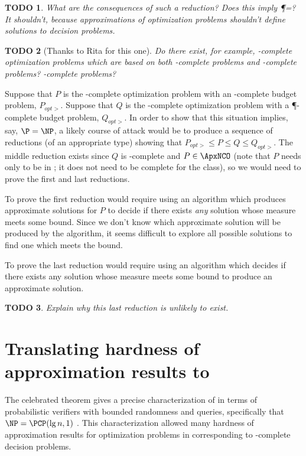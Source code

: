 \documentclass[]{article}
\theoremstyle{plain}
\newtheorem{todo}{TODO}
\theoremstyle{definition}
\begin{document}
\begin{todo}
  What are the consequences of such a reduction?
  Does this imply \P=\NP?
  It shouldn't, because approximations of optimization problems shouldn't define solutions to decision problems.
\end{todo}
\begin{todo}[Thanks to Rita for this one]
  Do there exist, for example, \ApxPO-complete optimization problems which are based on both \NP-complete problems and \PSPACE-complete problems?
  \STP-complete problems?
\end{todo}

Suppose that $P$ is the \ApxNCO-complete optimization problem with an \NP-complete budget problem, $P_{opt>}$.
Suppose that $Q$ is the \ApxNCO-complete optimization problem with a \P-complete budget problem, $Q_{opt>}$.
In order to show that this situation implies, say, $\P=\NP$, a likely course of attack would be to produce a sequence of reductions (of an appropriate type) showing that $P_{opt>} \leq P \leq Q \leq Q_{opt>}$.
The middle reduction exists since $Q$ is \ApxNCO-complete and $P\in\ApxNCO$ (note that $P$ needs only to be in \ApxNCO; it does not need to be complete for the class), so we would need to prove the first and last reductions.

To prove the first reduction would require using an algorithm which produces approximate solutions for $P$ to decide if there exists \emph{any} solution whose measure meets some bound.
Since we don't know which approximate solution will be produced by the algorithm, it seems difficult to explore all possible solutions to find one which meets the bound.

To prove the last reduction would require using an algorithm which decides if there exists any solution whose measure meets some bound to produce an approximate solution.

\begin{todo}
  Explain why this last reduction is unlikely to exist.
\end{todo}

\section{Translating hardness of approximation results to \texorpdfstring{\NC}{NC}}

The celebrated \PCP{} theorem gives a precise characterization of \NP{} in terms of probabilistic verifiers with bounded randomness and queries, specifically that $\NP = \PCP(\lg n, 1)$ \cite{pcp}.
This characterization allowed many hardness of approximation results for optimization problems in \NPO{} corresponding to \NP-complete decision problems.
\end{document}
